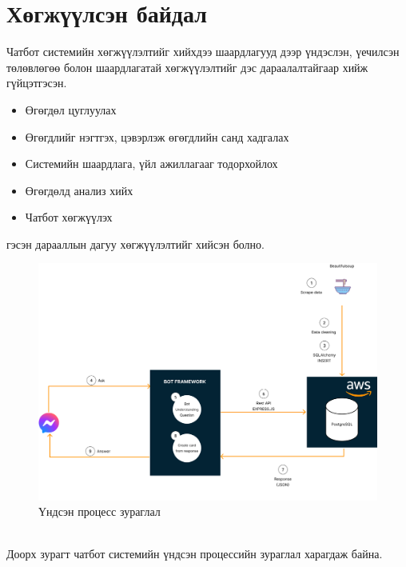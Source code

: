 \section{Хөгжүүлсэн байдал}
Чатбот системийн хөгжүүлэлтийг хийхдээ шаардлагууд дээр үндэслэн, үечилсэн төлөвлөгөө болон шаардлагатай хөгжүүлэлтийг дэс дараалалтайгаар хийж гүйцэтгэсэн.
\begin{itemize}
  \item Өгөгдөл цуглуулах
  \item Өгөгдлийг нэгтгэх, цэвэрлэж өгөгдлийн санд хадгалах
  \item Системийн шаардлага, үйл ажиллагааг тодорхойлох
  \item Өгөгдөлд анализ хийх
  \item Чатбот хөгжүүлэх
\end{itemize}
гэсэн дарааллын дагуу хөгжүүлэлтийг хийсэн болно.
\begin{figure}[ht]
  \centering
  \includegraphics[width = \textwidth-2cm]{images/mainProcess.png}
  \caption{Үндсэн процесс зураглал}\label{mainProcess}
\end{figure}
\\Доорх зурагт чатбот системийн үндсэн процессийн зураглал харагдаж байна. 

\newpage
